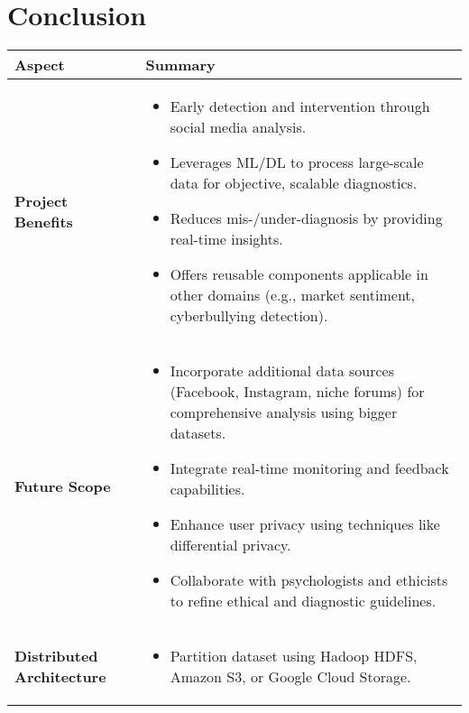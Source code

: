 
\section{Conclusion}

\begin{table}[H]
    \label{tab:project_summary}
    \begin{tabularx}{\textwidth}{|>{\raggedright\arraybackslash}p{3cm}|X|}
    \hline
    \rowcolor{lightestgray}
    \textbf{Aspect} & \textbf{Summary} \\ \hline
    \textbf{Project Benefits} & 
    \begin{itemize}[noitemsep, leftmargin=*, topsep=0pt]
        \item Early detection and intervention through social media analysis.
        \item Leverages ML/DL to process large-scale data for objective, scalable diagnostics.
        \item Reduces mis-/under-diagnosis by providing real-time insights.
        \item Offers reusable components applicable in other domains (e.g., market sentiment, cyberbullying detection).
    \end{itemize} \\ \hline
    \textbf{Future Scope} & 
    \begin{itemize}[noitemsep, leftmargin=*, topsep=0pt]
        \item Incorporate additional data sources (Facebook, Instagram, niche forums) for comprehensive analysis using bigger datasets.
        \item Integrate real-time monitoring and feedback capabilities.
        \item Enhance user privacy using techniques like differential privacy.
        \item Collaborate with psychologists and ethicists to refine ethical and diagnostic guidelines.
    \end{itemize} \\ \hline
    \textbf{Distributed Architecture} & 
    \begin{itemize}[noitemsep, leftmargin=*, topsep=0pt]
        \item Partition dataset using Hadoop HDFS, Amazon S3, or Google Cloud Storage.

\end{itemize}
\end{tabularx}
\end{table}
